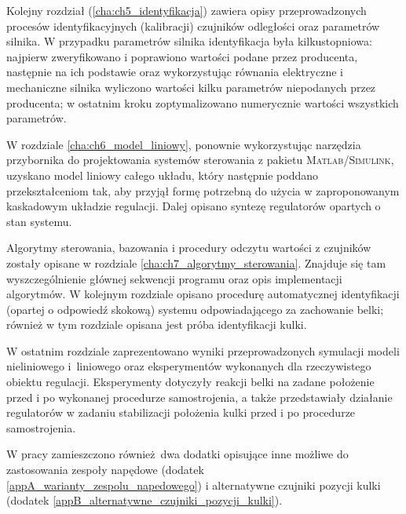 Kolejny rozdział (\ref{cha:ch5_identyfikacja}) zawiera opisy przeprowadzonych procesów identyfikacyjnych (kalibracji) czujników odległości oraz parametrów silnika. W przypadku parametrów silnika identyfikacja była kilkustopniowa: najpierw zweryfikowano i poprawiono wartości podane przez producenta, następnie na ich podstawie oraz wykorzystując równania elektryczne i mechaniczne silnika wyliczono wartości kilku parametrów niepodanych przez producenta; w ostatnim kroku zoptymalizowano numerycznie wartości wszystkich parametrów.

W rozdziale \ref{cha:ch6_model_liniowy}, ponownie wykorzystując narzędzia przybornika do projektowania systemów sterowania z pakietu \textsc{Matlab/Simulink}, uzyskano model liniowy całego układu, który następnie poddano przekształceniom tak, aby przyjął formę potrzebną do użycia w zaproponowanym kaskadowym układzie regulacji. Dalej opisano syntezę regulatorów opartych o stan systemu.

Algorytmy sterowania, bazowania i procedury odczytu wartości z czujników zostały opisane w rozdziale \ref{cha:ch7_algorytmy_sterowania}. Znajduje się tam wyszczególnienie głównej sekwencji programu oraz opis implementacji algorytmów. W kolejnym rozdziale opisano procedurę automatycznej identyfikacji (opartej o odpowiedź skokową) systemu odpowiadającego za zachowanie belki; również w tym rozdziale opisana jest próba identyfikacji kulki.

W ostatnim rozdziale zaprezentowano wyniki przeprowadzonych symulacji modeli nieliniowego i~liniowego oraz eksperymentów wykonanych dla rzeczywistego obiektu regulacji. Eksperymenty dotyczyły reakcji belki na zadane położenie przed i po wykonanej procedurze samostrojenia, a także przedstawiały działanie regulatorów w zadaniu stabilizacji położenia kulki przed i po procedurze samo\-strojenia.

W pracy zamieszczono również dwa dodatki opisujące inne możliwe do zastosowania zespoły napędowe (dodatek \ref{appA_warianty_zespolu_napedowego}) i alternatywne czujniki pozycji kulki (dodatek \ref{appB_alternatywne_czujniki_pozycji_kulki}).


